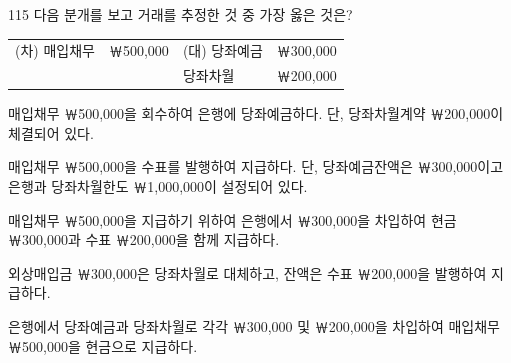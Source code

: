 \begin{question}{115}
다음 분개를 보고 거래를 추정한 것 중 가장 옳은 것은?

{\small\centering
\begin{tabular}{lrlr}
\hline
(차) 매입채무 & ￦500,000 & (대) 당좌예금 & ￦300,000 \\
 & & 당좌차월 & ￦200,000 \\
\hline
\end{tabular}
\par}

\begin{choices}
  \item 매입채무 ￦500,000을 회수하여 은행에 당좌예금하다. 단, 당좌차월계약 ￦200,000이 체결되어 있다.
  \item 매입채무 ￦500,000을 수표를 발행하여 지급하다. 단, 당좌예금잔액은 ￦300,000이고 은행과 당좌차월한도 ￦1,000,000이 설정되어 있다.
  \item 매입채무 ￦500,000을 지급하기 위하여 은행에서 ￦300,000을 차입하여 현금 ￦300,000과 수표 ￦200,000을 함께 지급하다.
  \item 외상매입금 ￦300,000은 당좌차월로 대체하고, 잔액은 수표 ￦200,000을 발행하여 지급하다.
  \item 은행에서 당좌예금과 당좌차월로 각각 ￦300,000 및 ￦200,000을 차입하여 매입채무 ￦500,000을 현금으로 지급하다.
\end{choices}
\end{question}
